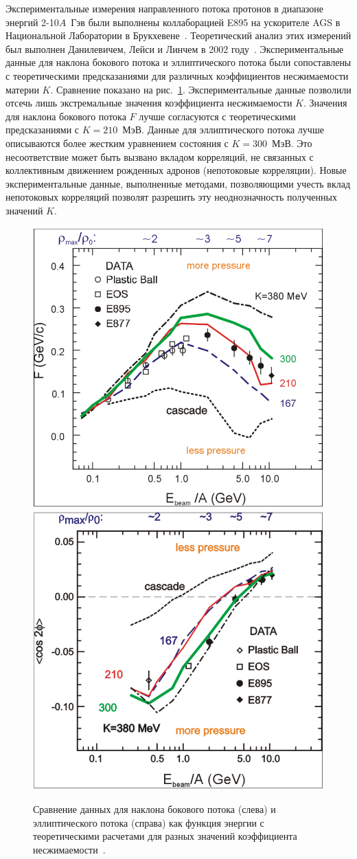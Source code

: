 Экспериментальные измерения направленного потока протонов в диапазоне энергий 2-10$A$~Гэв были выполнены коллаборацией E895 на ускорителе AGS в Национальной Лаборатории в Брукхевене~\cite{E895:2000maf}. 
Теоретический анализ этих измерений был выполнен Данилевичем, Лейси и Линчем в 2002 году~\cite{Danielewicz:2002pu}.
Экспериментальные данные для наклона бокового потока и эллиптического потока были сопоставлены с теоретическими предсказаниями для различных коэффициентов несжимаемости материи $K$.
Сравнение показано на рис.~\ref{fig:Danilewicz}. 
Экспериментальные данные позволили отсечь лишь экстремальные значения коэффициента несжимаемости $K$.
Значения для наклона бокового потока $F$ лучше согласуются с теоретическими предсказаниями с $K=210$~МэВ. 
Данные для эллиптического потока лучше описываются более жестким уравнением состояния с $K=300$~МэВ.
Это несоответствие может быть вызвано вкладом корреляций, не связанных с коллективным движением рожденных адронов (непотоковые корреляции).
Новые экспериментальные данные, выполненные методами, позволяющими учесть вклад непотоковых корреляций позволят разрешить эту неоднозначность полученных значений $K$.

\begin{figure}[h]
    \centering
    \includegraphics[width=0.45\linewidth]{images/Danilewicz_F_energy.png}
    \includegraphics[width=0.45\linewidth]{images/Danilewicz_Elliptic_energy.png}
    \caption{Сравнение данных для наклона бокового потока (слева) и эллиптического потока (справа) как функция энергии с теоретическими расчетами для разных значений коэффициента несжимаемости~\cite{Danielewicz:2002pu}.}
    \label{fig:Danilewicz}
\end{figure}

